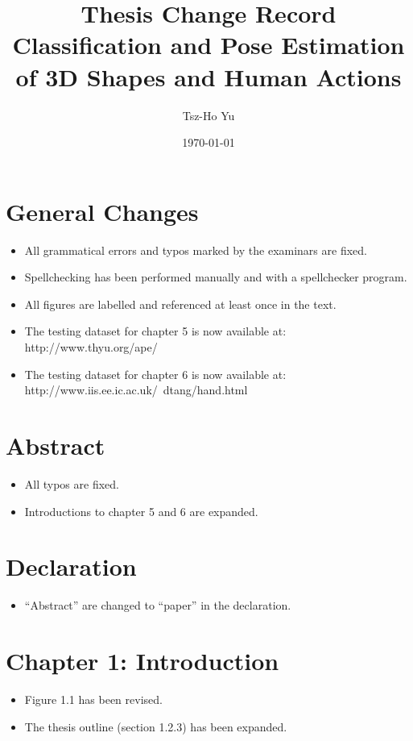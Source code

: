 \documentclass[10pt, a4paper]{article}
\title{Thesis Change Record \\ {\large Classification and Pose Estimation of 3D Shapes and Human Actions} }
\author{Tsz-Ho Yu}
\date{\today}
\begin{document}
\maketitle

\section{General Changes}
\begin{itemize}
\item All grammatical errors and typos marked by the examinars are fixed.
\item Spellchecking has been performed manually and with a spellchecker program.
\item All figures are labelled and referenced at least once in the text.
\item The testing dataset for chapter 5 is now available at: http://www.thyu.org/ape/
\item The testing dataset for chapter 6 is now available at: http://www.iis.ee.ic.ac.uk/~dtang/hand.html
\end{itemize}

\section{Abstract}
\begin{itemize}
\item All typos are fixed.
\item Introductions to chapter 5 and 6 are expanded.
\end{itemize}

\section{Declaration}
\begin{itemize}
\item ``Abstract'' are changed to ``paper'' in the declaration.
\end{itemize}

\section{Chapter 1: Introduction}
\begin{itemize}
\item Figure 1.1 has been revised.
\item The thesis outline (section 1.2.3) has been expanded.
\end{itemize}
\end{document}
